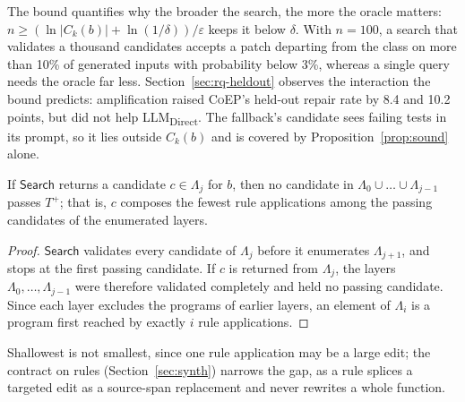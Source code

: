 \documentclass[acmsmall,screen,review,anonymous,nonacm]{acmart}
\newcommand{\tool}{\textsc{CoEP}\xspace}
\newcommand{\direct}{LLM\textsubscript{Direct}\xspace}
\newcommand{\aux}[1]{\ensuremath{\mathsf{#1}}}
\begin{document}
The bound quantifies why the broader the search, the more the oracle matters: $n \ge (\ln |C_k(b)| + \ln(1/\delta))/\varepsilon$ keeps it below $\delta$. With $n = 100$, a search that validates a thousand candidates accepts a patch departing from the class on more than 10\% of generated inputs with probability below 3\%, whereas a single query needs the oracle far less. Section~\ref{sec:rq-heldout} observes the interaction the bound predicts: amplification raised \tool's held-out repair rate by 8.4 and 10.2 points, but did not help \direct. The fallback's candidate sees failing tests in its prompt, so it lies outside $C_k(b)$ and is covered by Proposition~\ref{prop:sound} alone.

\begin{proposition}\label{prop:shallow}
If \aux{Search} returns a candidate $c \in \Lambda_j$ for $b$, then no candidate in $\Lambda_0 \cup \dots \cup \Lambda_{j-1}$ passes $T^{+}$; that is, $c$ composes the fewest rule applications among the passing candidates of the enumerated layers.
\end{proposition}
\begin{proof}
\aux{Search} validates every candidate of $\Lambda_j$ before it enumerates $\Lambda_{j+1}$, and stops at the first passing candidate. If $c$ is returned from $\Lambda_j$, the layers $\Lambda_0, \dots, \Lambda_{j-1}$ were therefore validated completely and held no passing candidate. Since each layer excludes the programs of earlier layers, an element of $\Lambda_i$ is a program first reached by exactly $i$ rule applications.
\end{proof}
Shallowest is not smallest, since one rule application may be a large edit; the contract on rules (Section~\ref{sec:synth}) narrows the gap, as a rule splices a targeted edit as a source-span replacement and never rewrites a whole function.
\end{document}
